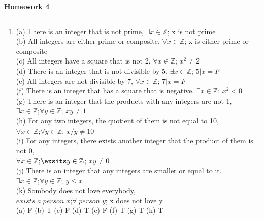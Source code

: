 \documentclass[12pt]{article}
\begin{document}
\begin{center}
\textbf{\Large Homework 4}\\
\end{center}
\hrule

\vspace{0.2cm}
\begin{enumerate}
\item
{}(a) There is an integer that is not prime, $\exists x \in \mathbb{Z}$; x is not prime\\
(b) All integers are either prime or composite, $\forall x \in \mathbb{Z}$; x is either prime or composite\\
(c) All integers have a square that is not 2, $\forall x \in \mathbb{Z}$; $x^{2} \neq 2$\\
(d) There is an integer that is not divisible by 5, $\exists x \in \mathbb{Z}$; $5|x =F$\\
(e) All integers are not divisible by 7,  $\forall x \in \mathbb{Z}$; $7|x =F$\\
(f) There is an integer that has a square that is negative, $\exists x \in \mathbb{Z}$; $x^{2} <0$\\
(g) There is an integer that the products with any integers are not 1, \\$\exists x \in \mathbb{Z}$;$\forall y \in \mathbb{Z}$; $xy \neq 1$\\
(h) For any two integers, the quotient of them is not equal to 10, \\$\forall x \in \mathbb{Z}$;$\forall y \in \mathbb{Z}$; $x/y \neq 10$\\
(i) For any integers, there exists another integer that the product of them is not 0,\\ $\forall x \in \mathbb{Z}$;$\exsits y \in \mathbb{Z}$; $xy \neq 0$\\
(j) There is an integer that any integers are smaller or equal to it. \\$\exists x \in \mathbb{Z}$;$\forall y \in \mathbb{Z}$; $y \leq x$\\
(k) Sombody does not love everybody, \\$exists \; a \;person\; x$;$\forall \;person\; y$; x does not love y\\
(a) F (b) T (c) F (d) T (e) F (f) T (g) T (h) T\\


\end{enumerate}
\end{document}
